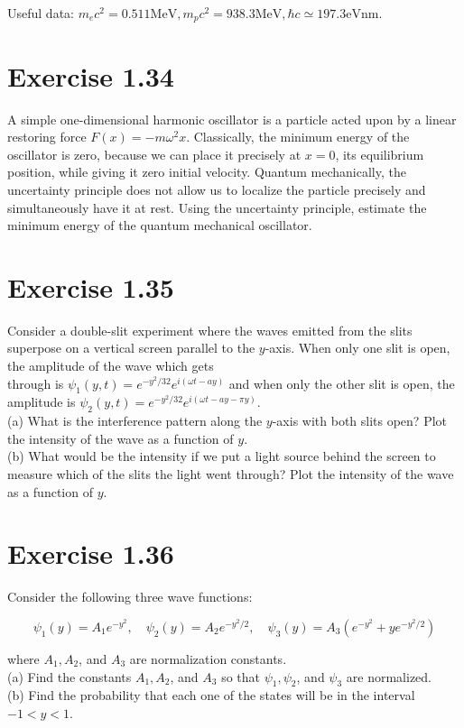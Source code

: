 \documentclass[10pt]{article}
\begin{document}
Useful data: $m_{e} c^{2}=0.511 \mathrm{MeV}, m_{p} c^{2}=938.3 \mathrm{MeV}, \hbar c \simeq 197.3 \mathrm{eV} \mathrm{nm}$.

\section*{Exercise 1.34}
A simple one-dimensional harmonic oscillator is a particle acted upon by a linear restoring force $F(x)=-m \omega^{2} x$. Classically, the minimum energy of the oscillator is zero, because we can place it precisely at $x=0$, its equilibrium position, while giving it zero initial velocity. Quantum mechanically, the uncertainty principle does not allow us to localize the particle precisely and simultaneously have it at rest. Using the uncertainty principle, estimate the minimum energy of the quantum mechanical oscillator.

\section*{Exercise 1.35}
Consider a double-slit experiment where the waves emitted from the slits superpose on a vertical screen parallel to the $y$-axis. When only one slit is open, the amplitude of the wave which gets\\
through is $\psi_{1}(y, t)=e^{-y^{2} / 32} e^{i(\omega t-a y)}$ and when only the other slit is open, the amplitude is $\psi_{2}(y, t)=e^{-y^{2} / 32} e^{i(\omega t-a y-\pi y)}$.\\
(a) What is the interference pattern along the $y$-axis with both slits open? Plot the intensity of the wave as a function of $y$.\\
(b) What would be the intensity if we put a light source behind the screen to measure which of the slits the light went through? Plot the intensity of the wave as a function of $y$.

\section*{Exercise 1.36}
Consider the following three wave functions:

$$
\psi_{1}(y)=A_{1} e^{-y^{2}}, \quad \psi_{2}(y)=A_{2} e^{-y^{2} / 2}, \quad \psi_{3}(y)=A_{3}\left(e^{-y^{2}}+y e^{-y^{2} / 2}\right)
$$

where $A_{1}, A_{2}$, and $A_{3}$ are normalization constants.\\
(a) Find the constants $A_{1}, A_{2}$, and $A_{3}$ so that $\psi_{1}, \psi_{2}$, and $\psi_{3}$ are normalized.\\
(b) Find the probability that each one of the states will be in the interval $-1<y<1$.
\end{document}
